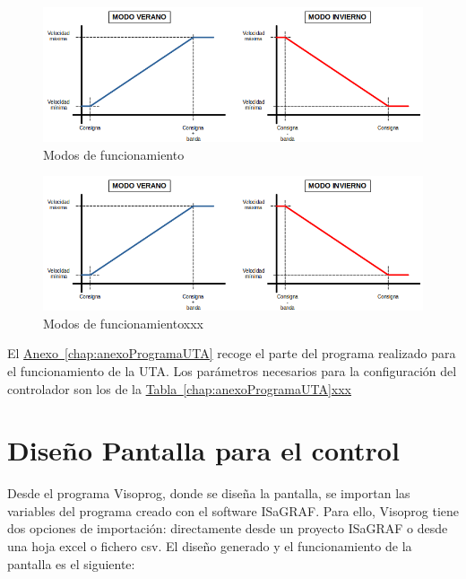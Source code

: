 \begin{figure}[H]
  \centering
  \includegraphics[width=\textwidth, keepaspectratio]{img/curvaModos}
  \caption{Modos de funcionamiento}
  \label{figura:curvasModos}
\end{figure}

\begin{figure}[H]
  \centering
  \includegraphics[width=\textwidth, keepaspectratio]{img/curvaModos}
  \caption{Modos de funcionamientoxxx}
  \label{figura:curvasModos}
\end{figure}

El \hyperref[chap:anexoProgramaUTA]{Anexo~\ref{chap:anexoProgramaUTA}} recoge el parte del programa realizado para el funcionamiento de la UTA. Los parámetros necesarios para la configuración del controlador son los de la \hyperref[chap:anexoProgramaUTA]{Tabla~\ref{chap:anexoProgramaUTA}xxx}


\section{Diseño Pantalla para el control}
\label{sec:programacionpantalla}
Desde el programa Visoprog, donde se diseña la pantalla, se importan las variables del programa creado con el software ISaGRAF. Para ello, Visoprog tiene dos opciones de importación: directamente desde un proyecto ISaGRAF o desde una hoja excel o fichero csv. El diseño generado y el funcionamiento de la pantalla es el siguiente:


